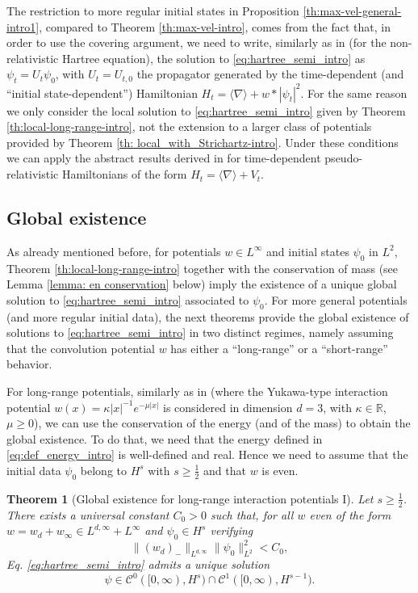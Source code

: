 \documentclass[12pt]{article}
\theoremstyle{plain}
\newtheorem{theo}{Theorem}[section]
\begin{document}
The restriction to more regular initial states in Proposition \ref{th:max-vel-general-intro1}, compared to Theorem \ref{th:max-vel-intro}, comes from the fact that, in order to use the covering argument, we need to write, similarly as in \cite{ArbunichFaupinPusateriSigal23} (for the non-relativistic Hartree equation), the solution to  \eqref{eq:hartree_semi_intro} as $\psi_t=U_t\psi_0$, with $U_t=U_{t,0}$ the propagator generated by the time-dependent (and ``initial state-dependent'') Hamiltonian $H_t=\langle\nabla\rangle+w*|\psi_t|^2$. For the same reason we only consider the local solution to \eqref{eq:hartree_semi_intro} given by Theorem \ref{th:local-long-range-intro}, not the extension to a larger class of potentials provided by Theorem \ref{th: local_with_Strichartz-intro}. Under these conditions we can apply the abstract results derived in %
\cite{BFG2a} for time-dependent pseudo-relativistic Hamiltonians of the form $H_t=\langle\nabla\rangle+V_t$. 


\subsection{Global existence}

As already mentioned before, for potentials $w\in L^\infty$ and initial states $\psi_0$ in $L^2$, Theorem \ref{th:local-long-range-intro} together with the conservation of mass (see Lemma \ref{lemma: en conservation} below) imply the existence of a unique global solution to \eqref{eq:hartree_semi_intro} associated to $\psi_0$. For more general potentials (and more regular initial data), the next  theorems provide the global existence of solutions to \eqref{eq:hartree_semi_intro} in two distinct regimes, namely assuming that the convolution potential $w$ has either a ``long-range'' or a ``short-range'' behavior. 

For long-range potentials, similarly as in \cite{lenzmann_semirel} (where the Yukawa-type interaction potential $w(x)=\kappa|x|^{-1}e^{-\mu|x|}$ is considered in dimension $d=3$, with $\kappa\in\mathbb{R}$, $\mu\ge0$), we can use the conservation of the energy (and of the mass) to obtain the global existence. To do that, we need that the energy defined in \eqref{eq:def_energy_intro} is well-defined and real. Hence we need to assume that the initial data $\psi_0$ belong to $H^s$ with $s\ge\frac12$ and that $w$ is even.

\begin{theo}[Global existence for long-range interaction potentials I]\label{th:global-long-range-intro}
	Let $s\ge\frac12$. There exists a universal constant $C_0>0$ such that, for all $w$ even of the form $w = w_d + w_\infty \in L^{d, \infty} + L^\infty$ and $\psi_0 \in H^{s}$ verifying
	\begin{equation}
	\label{eq: glob ex w_1 small-intro}
	    \| (w_d)_-\|_{L^{d, \infty}}\|\psi_0\|^2_{L^{2}}<C_0 ,
	\end{equation}
	Eq. \eqref{eq:hartree_semi_intro} admits a unique solution 
	\begin{equation*}
		\psi \in \mathcal{C}^0([0,\infty), H^{s}) \cap \mathcal{C}^1 ([0,\infty), H^{s-1}).
	\end{equation*}
\end{theo}
\end{document}
